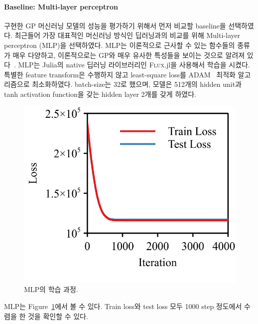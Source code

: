 \documentclass[ba]{imsart}
\begin{document}
\paragraph{Baseline: Multi-layer perceptron}
구현한 GP 머신러닝 모델의 성능을 평가하기 위해서 먼저 비교할 baseline을 선택하였다.
최근들어 가장 대표적인 머신러닝 방식인 딥러닝과의 비교를 위해 Multi-layer perceptron (MLP)을 선택하였다.
MLP는 이론적으로 근사할 수 있는 함수들의 종류가 매우 다양하고, 이론적으로는 GP와 매우 유사한 특성들을 보이는 것으로 알려져 있다~\citep{neal_bayesian_1996}.
MLP는 Julia의 native 딥러닝 라이브러리인 \textsc{Flux}.jl을 사용해서 학습을 시켰다.
특별한 feature transform은 수행하지 않고 least-square loss를 ADAM~\citep{kingma_adam_2017} 최적화 알고리즘으로 최소화하였다.
batch-size는 32로 했으며, 모델은 512개의 hidden unit과 tanh activation function을 갖는 hidden layer 2개를 갖게 하였다.
%
\begin{figure}[t]
  \centering
  \includegraphics[scale=1.0]{figures/mlp_train_01.png}
  \caption{MLP의 학습 과정.}\label{fig:mlp_train}
\end{figure}
%
MLP는 Figure~\ref{fig:mlp_train}에서 볼 수 있다.
Train loss와 test loss 모두 1000 step 정도에서 수렴을 한 것을 확인할 수 있다.
\end{document}
